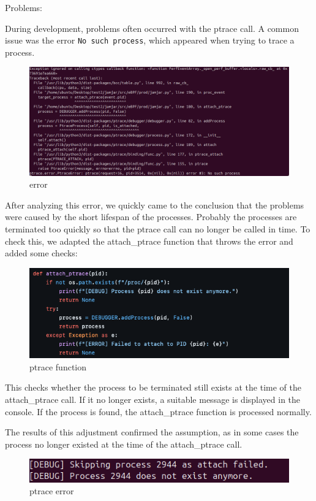 Problems:

During development, problems often occurred with the ptrace call. A common issue was the error \texttt{No such process}, which appeared when trying to trace a process.

\begin{figure}[H]
    \centering
    \includegraphics[width=1\linewidth]{bilder/error.PNG}
    \caption{error}
\end{figure}

After analyzing this error, we quickly came to the conclusion that the problems were caused by the short lifespan of the processes. Probably the processes are terminated too quickly so that the ptrace call can no longer be called in time. To check this, we adapted the attach\_ptrace function that throws the error and added some checks:

\begin{figure}[H]
    \centering
    \includegraphics[width=1\linewidth]{bilder/attach_ptrace.PNG}
    \caption{ptrace function}
\end{figure}

This checks whether the process to be terminated still exists at the time of the attach\_ptrace call. If it no longer exists, a suitable message is displayed in the console. If the process is found, the attach\_ptrace function is processed normally.

The results of this adjustment confirmed the assumption, as in some cases the process no longer existed at the time of the attach\_ptrace call.

\begin{figure}[H]
    \centering
    \includegraphics[width=1\linewidth]{bilder/skipping.PNG}
    \caption{ptrace error}
\end{figure}